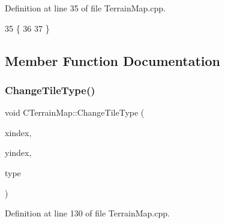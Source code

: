 Definition at line 35 of file Terrain\+Map.\+cpp.


\begin{DoxyCode}
35                          \{
36 
37 \}
\end{DoxyCode}


\subsection{Member Function Documentation}
\hypertarget{classCTerrainMap_a40757d66d7458620a327d6f69a35a2bd}{}\label{classCTerrainMap_a40757d66d7458620a327d6f69a35a2bd} 
\subsubsection{\texorpdfstring{Change\+Tile\+Type()}{ChangeTileType()}\hspace{0.1cm}{\footnotesize\ttfamily [1/2]}}
{\footnotesize\ttfamily void C\+Terrain\+Map\+::\+Change\+Tile\+Type (\begin{DoxyParamCaption}\item[{int}]{xindex,  }\item[{int}]{yindex,  }\item[{\hyperlink{classCTerrainMap_aff2ab991e237269941416dd79d8871d4}{E\+Tile\+Type}}]{type }\end{DoxyParamCaption})}



Definition at line 130 of file Terrain\+Map.\+cpp.


